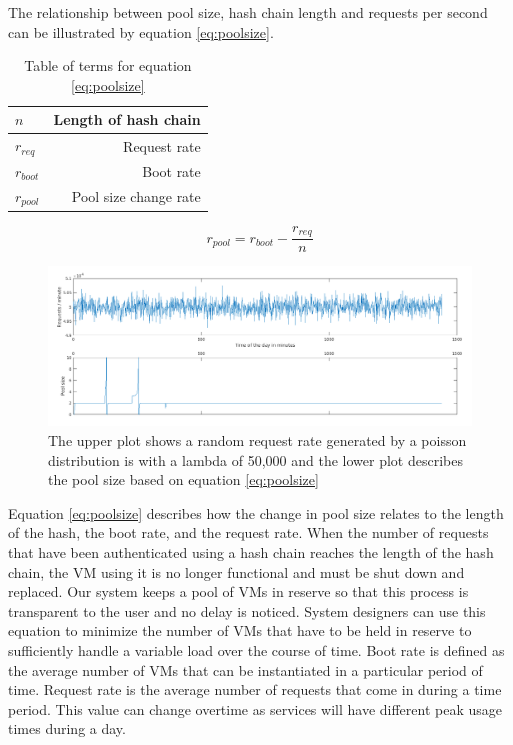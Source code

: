 \documentclass[a4paper,twoside]{article}
\begin{document}
The relationship between pool size, hash chain length and requests per second can be illustrated by equation \ref{eq:poolsize}.  

\begin{table}
	

\begin{center}
	\begin{tabular}{ | l | r |}
		\hline
		$n$ & Length of hash chain \\ \hline 
		$r_{req}$ & Request rate  \\ \hline
		$r_{boot}$ & Boot rate  \\ \hline
		$r_{pool}$ & Pool size change rate\\
		\hline
		
	\end{tabular}
	
	\label{tab:terms}
\end{center}
\caption{Table of terms for equation \ref{eq:poolsize}}
\end{table}

\begin{equation} 
 r_{pool} = r_{boot} - \frac{r_{req}}{n}
 \label{eq:poolsize}
\end{equation}
\begin{figure}[!ht]
  \centering
  \includegraphics[keepaspectratio=true,scale=0.375]{poolsize}
\caption{The upper plot shows a random request rate generated by a poisson distribution is with a lambda of 50,000 and the lower plot describes the pool size based on equation \ref{eq:poolsize}}
\label{fig:poolsize}
\end{figure}

Equation \ref{eq:poolsize} describes how the change in pool size relates to the length of the hash, the boot rate, and the request rate.   When the number of requests that have been authenticated using a hash chain reaches the length of the hash chain, the VM using it is no longer functional and must be shut down and replaced.  Our system keeps a pool of VMs in reserve so that this process is transparent to the user and no delay is noticed.  System designers can use this equation to minimize the number of VMs that have to be held in reserve to sufficiently handle a variable load over the course of time.  Boot rate is defined as the average number of VMs that can be instantiated in a particular period of time.  Request rate is the average number of requests that come in during a time period.  This value can change overtime as services will have different peak usage times during a day.  
\end{document}
